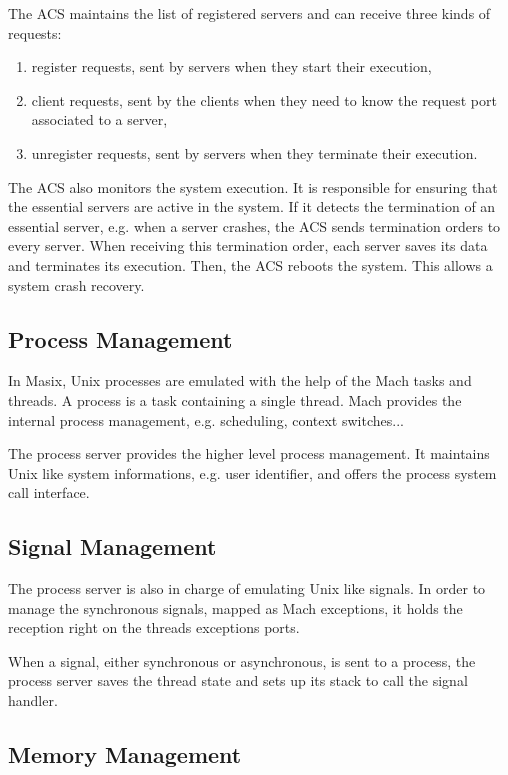 	The ACS maintains the list of registered servers and can receive three
kinds of requests:
\begin {enumerate}
\item register requests, sent by servers when they start their execution,
\item client requests, sent by the clients when they need to know the request
port associated to a server,
\item unregister requests, sent by servers when they terminate their
execution.
\end {enumerate}

	The ACS also monitors the system execution. It is responsible for
ensuring that the essential servers are active in the system. If it detects
the termination of an essential server, e.g. when a server crashes, the ACS
sends termination orders to every server. When receiving this termination
order, each server saves its data and terminates its execution. Then, the
ACS reboots the system. This allows a system crash recovery.

\subsection {Process Management}

	In Masix, Unix processes are emulated with the help of the Mach
tasks and threads. A process is a task containing a single thread. Mach
provides the internal process management, e.g. scheduling, context switches...

	The process server provides the higher level process management. It
maintains Unix like system informations, e.g. user identifier, and offers
the process system call interface.

\subsection {Signal Management}

	The process server is also in charge of emulating Unix like signals.
In order to manage the synchronous signals, mapped as Mach exceptions, it
holds the reception right on the threads exceptions ports.

	When a signal, either synchronous or asynchronous, is sent to a
process, the process server saves the thread state and sets up its stack
to call the signal handler.

\subsection {Memory Management}

